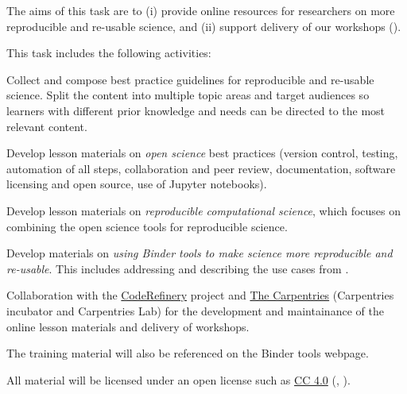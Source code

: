 \begin{task}[
  title=Best practice guidelines for reproducible science,
  id=online-resources,
  lead=UIO,
  PM=10,
  wphases={0-36!.28},
  partners={SRL,MP,UIO}
]
The aims of this task are to (i) provide online resources for researchers on more reproducible
and re-usable science, and (ii) support delivery of our workshops
().
  
This task includes the following activities:
  \begin{compactitem}
  \item Collect and compose best practice guidelines for reproducible and
    re-usable science. Split the content into multiple topic areas and target audiences so learners
    with different prior knowledge and needs can be directed to the most relevant content.
  \item Develop lesson materials on \emph{open science} best practices (version
    control, testing, automation of all steps, collaboration and peer review,
    documentation, software licensing and open source, use of Jupyter
    notebooks).
  \item Develop lesson materials on \emph{reproducible computational science},
    which focuses on combining the open science tools for reproducible science.
  \item Develop materials on \emph{using Binder tools to make science more
      reproducible and re-usable}. This includes addressing and describing the
    use cases from .
  \item Collaboration with the \href{https://coderefinery.org}{CodeRefinery}
    project and \href{https://carpentries.org/}{The Carpentries} (Carpentries incubator and Carpentries Lab) 
    for the development and maintainance of the online lesson materials and delivery of workshops.
  \item The training material will also be referenced on the Binder tools webpage.
  \end{compactitem}
  All material will be licensed under an open license such as
  \href{https://creativecommons.org/licenses/by/4.0/}{CC 4.0}
  (, ).
\end{task}
